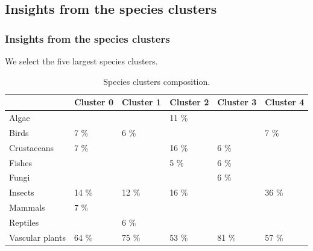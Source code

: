 \documentclass[
	11pt, %
]{beamer}
\begin{document}
\subsection{Insights from the species clusters}
\begin{frame}
\frametitle{Insights from the species clusters}
We select the five largest species clusters.
\begin{table}[H]
\smaller
\centering
\begin{tabular}{|l|l|l|l|l|l|}
\hline
             & Cluster 0 & Cluster 1         & Cluster 2  & Cluster 3           & Cluster 4 \\ \hline
Algae           &           &            & 11 \%      &            &            \\ \hline
Birds           & 7 \%      & 6 \%       &            &            & 7 \%       \\ \hline
Crustaceans     & 7 \%      &            & 16 \%      & 6 \%       &            \\ \hline
Fishes          &           &            & 5 \%       & 6 \%       &            \\ \hline
Fungi           &           &            &            & 6 \%       &            \\ \hline
Insects         & 14 \%     & 12 \%      & 16 \%      &            & 36 \%      \\ \hline
Mammals         & 7 \%      &            &            &            &            \\ \hline
Reptiles        &           & 6 \%       &            &            &            \\ \hline
Vascular plants & 64 \%     & 75 \%      & 53 \%      & 81 \%      & 57 \%      \\ \hline
\end{tabular}
\caption{Species clusters composition.}
\label{table:clusters_species}
\end{table}

\end{frame}
\end{document}
